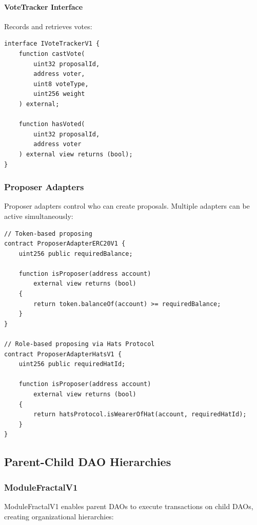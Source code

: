 \paragraph{VoteTracker Interface} Records and retrieves votes:

\begin{lstlisting}[caption=VoteTracker Interface]
interface IVoteTrackerV1 {
    function castVote(
        uint32 proposalId,
        address voter,
        uint8 voteType,
        uint256 weight
    ) external;

    function hasVoted(
        uint32 proposalId,
        address voter
    ) external view returns (bool);
}
\end{lstlisting}

\subsubsection{Proposer Adapters}

Proposer adapters control who can create proposals. Multiple adapters can be active simultaneously:

\begin{lstlisting}[caption=Proposer Adapter Examples]
// Token-based proposing
contract ProposerAdapterERC20V1 {
    uint256 public requiredBalance;

    function isProposer(address account)
        external view returns (bool)
    {
        return token.balanceOf(account) >= requiredBalance;
    }
}

// Role-based proposing via Hats Protocol
contract ProposerAdapterHatsV1 {
    uint256 public requiredHatId;

    function isProposer(address account)
        external view returns (bool)
    {
        return hatsProtocol.isWearerOfHat(account, requiredHatId);
    }
}
\end{lstlisting}

\subsection{Parent-Child DAO Hierarchies}

\subsubsection{ModuleFractalV1}

ModuleFractalV1 enables parent DAOs to execute transactions on child DAOs, creating organizational hierarchies:

